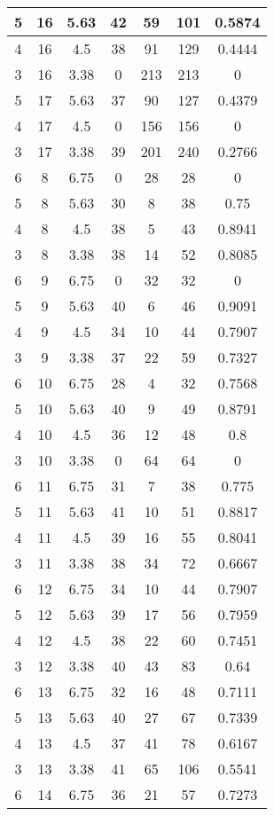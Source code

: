 \documentclass[letterpaper, 12pt]{article}
\begin{document}
\begin{longtable}{|c|c|c|c|c|c|c|}
\hline
5 & 16 & 5.63 & 42 & 59 & 101 & 0.5874 \\
\hline
4 & 16 & 4.5 & 38 & 91 & 129 & 0.4444 \\
\hline
3 & 16 & 3.38 & 0 & 213 & 213 & 0 \\
\hline
5 & 17 & 5.63 & 37 & 90 & 127 & 0.4379 \\
\hline
4 & 17 & 4.5 & 0 & 156 & 156 & 0 \\
\hline
3 & 17 & 3.38 & 39 & 201 & 240 & 0.2766 \\
\hline
6 & 8 & 6.75 & 0 & 28 & 28 & 0 \\
\hline
5 & 8 & 5.63 & 30 & 8 & 38 & 0.75 \\
\hline
4 & 8 & 4.5 & 38 & 5 & 43 & 0.8941 \\
\hline
3 & 8 & 3.38 & 38 & 14 & 52 & 0.8085 \\
\hline
6 & 9 & 6.75 & 0 & 32 & 32 & 0 \\
\hline
5 & 9 & 5.63 & 40 & 6 & 46 & 0.9091 \\
\hline
4 & 9 & 4.5 & 34 & 10 & 44 & 0.7907 \\
\hline
3 & 9 & 3.38 & 37 & 22 & 59 & 0.7327 \\
\hline
6 & 10 & 6.75 & 28 & 4 & 32 & 0.7568 \\
\hline
5 & 10 & 5.63 & 40 & 9 & 49 & 0.8791 \\
\hline
4 & 10 & 4.5 & 36 & 12 & 48 & 0.8 \\
\hline
3 & 10 & 3.38 & 0 & 64 & 64 & 0 \\
\hline
6 & 11 & 6.75 & 31 & 7 & 38 & 0.775 \\
\hline
5 & 11 & 5.63 & 41 & 10 & 51 & 0.8817 \\
\hline
4 & 11 & 4.5 & 39 & 16 & 55 & 0.8041 \\
\hline
3 & 11 & 3.38 & 38 & 34 & 72 & 0.6667 \\
\hline
6 & 12 & 6.75 & 34 & 10 & 44 & 0.7907 \\
\hline
5 & 12 & 5.63 & 39 & 17 & 56 & 0.7959 \\
\hline
4 & 12 & 4.5 & 38 & 22 & 60 & 0.7451 \\
\hline
3 & 12 & 3.38 & 40 & 43 & 83 & 0.64 \\
\hline
6 & 13 & 6.75 & 32 & 16 & 48 & 0.7111 \\
\hline
5 & 13 & 5.63 & 40 & 27 & 67 & 0.7339 \\
\hline
4 & 13 & 4.5 & 37 & 41 & 78 & 0.6167 \\
\hline
3 & 13 & 3.38 & 41 & 65 & 106 & 0.5541 \\
\hline
6 & 14 & 6.75 & 36 & 21 & 57 & 0.7273 \\

\end{longtable}
\end{document}
